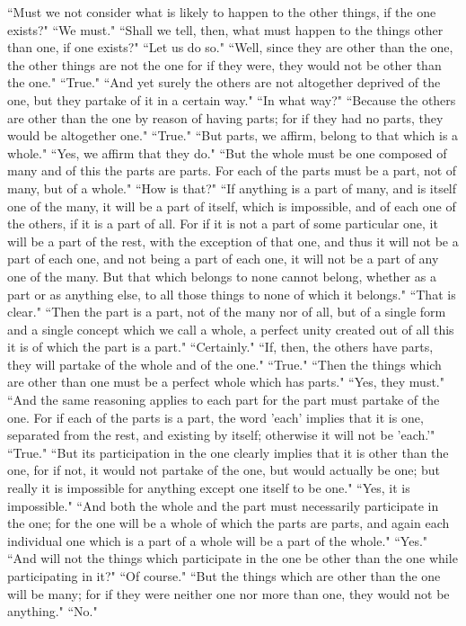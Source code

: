 \documentclass[letterpaper,12pt]{article}
\newcommand{\stephpag}[1]{\marginnote{\small\itshape\fontfamily{ppl}\selectfont #1}}
\begin{document}
``Must we not consider what is likely to happen to the other things, if the one exists?" ``We must." ``Shall we tell, then, what must happen to the things other than one, if one exists?" ``Let us do so." ``Well, since they are other than the one, the other things are not the one for if they were, they would not be other than the one." ``True." \stephpag{c} ``And yet surely the others are not altogether deprived of the one, but they partake of it in a certain way." ``In what way?" ``Because the others are other than the one by reason of having parts; for if they had no parts, they would be altogether one." ``True." ``But parts, we affirm, belong to that which is a whole." ``Yes, we affirm that they do." ``But the whole must be one composed of many and of this the parts are parts. For each of the parts must be a part, not of many, but of a whole." ``How is that?" ``If anything is a part of many, and is itself one of the many, it will be a part of itself, \stephpag{d} which is impossible, and of each one of the others, if it is a part of all. For if it is not a part of some particular one, it will be a part of the rest, with the exception of that one, and thus it will not be a part of each one, and not being a part of each one, it will not be a part of any one of the many. But that which belongs to none cannot belong, whether as a part or as anything else, to all those things to none of which it belongs." ``That is clear." ``Then the part is a part, not of the many nor of all, but of a single form and a single concept \stephpag{e} which we call a whole, a perfect unity created out of all this it is of which the part is a part." ``Certainly." ``If, then, the others have parts, they will partake of the whole and of the one." ``True." ``Then the things which are other than one must be a perfect whole which has parts." ``Yes, they must." ``And the same reasoning applies to each part for the part must partake of the one. For if each of the parts is a part, \stephpag{158 a} the word 'each' implies that it is one, separated from the rest, and existing by itself; otherwise it will not be 'each.'" ``True." ``But its participation in the one clearly implies that it is other than the one, for if not, it would not partake of the one, but would actually be one; but really it is impossible for anything except one itself to be one." ``Yes, it is impossible." ``And both the whole and the part must necessarily participate in the one; for the one will be a whole of which the parts are parts, and again each individual one which is a part of a whole will be a part of the whole." ``Yes." \stephpag{b} ``And will not the things which participate in the one be other than the one while participating in it?" ``Of course." ``But the things which are other than the one will be many; for if they were neither one nor more than one, they would not be anything." ``No."
\end{document}
